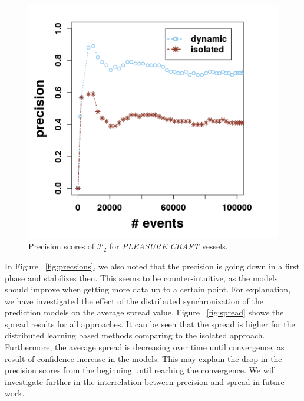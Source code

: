  \begin{figure}[h]
	
	\includegraphics[width=.5\textwidth]{figures/precision_p2.png}
	
	\caption{Precision scores of $\mathcal{P}_2$  for \textit{PLEASURE CRAFT} vessels.}
	\label{fig:precsions_p2}
\end{figure}

\par In Figure ~\ref{fig:precsions}, we also noted that the precision is going down in a first phase and stabilizes then.  This seems to be counter-intuitive, as the models should improve when getting more data up to a certain point. For explanation, we have investigated the effect of the distributed synchronization of the prediction models on the average spread value, Figure  ~\ref{fig:spread}  shows the spread results for all approaches. It can be seen that the spread is higher for the distributed learning based methods comparing to the isolated approach. Furthermore, the average spread is decreasing over time until convergence, as result of confidence increase in the models. This may explain the drop in the precision scores from the beginning until reaching the convergence. We will investigate further in the interrelation between precision and spread in future work. 


